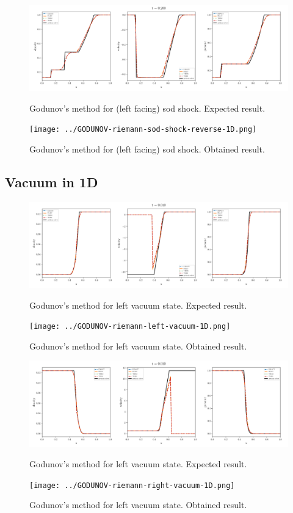     \begin{figure}[htbp]
        \centering
        \includegraphics[width=.9\textwidth]{./figures/GODUNOV-riemann-sod-shock-reverse-1D.png}%
        \caption{Godunov's method for (left facing) sod shock. Expected result.}
        \texttt{[image: ../GODUNOV-riemann-sod-shock-reverse-1D.png]}%
        \caption{Godunov's method for (left facing) sod shock. Obtained result.}
    \end{figure}










\clearpage
\subsection{Vacuum in 1D}

    \begin{figure}[htbp]
        \centering
        \includegraphics[width=.9\textwidth]{./figures/GODUNOV-riemann-left-vacuum-1D.png}%
        \caption{Godunov's method for left vacuum state. Expected result.}
        \texttt{[image: ../GODUNOV-riemann-left-vacuum-1D.png]}
        \caption{Godunov's method for left vacuum state. Obtained result.}
    \end{figure}


    \begin{figure}[htbp]
        \centering
        \includegraphics[width=.9\textwidth]{./figures/GODUNOV-riemann-right-vacuum-1D.png}%
        \caption{Godunov's method for left vacuum state. Expected result.}
        \texttt{[image: ../GODUNOV-riemann-right-vacuum-1D.png]}
        \caption{Godunov's method for left vacuum state. Obtained result.}
    \end{figure}


